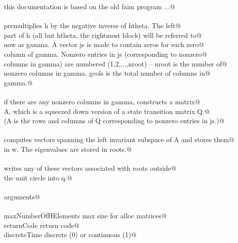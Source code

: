 \documentclass[12pt]{article}
\begin{document}
\begin{flushleft}
\begin{minipage}{\linewidth}
\begin{list}{}{}
\mbox{}\verb@        this documentation is based on the old faim program ...@\\
\mbox{}\verb@@\\
\mbox{}\verb@    premultiplies h by the negative inverse of htheta.  The left@\\
\mbox{}\verb@    part of h (all but htheta, the rightmost block) will be referred to@\\
\mbox{}\verb@    now as gamma.  A vector js is made to contain zeros for each zero@\\
\mbox{}\verb@    column of gamma.  Nonzero entries in js (corresponding to nonzero@\\
\mbox{}\verb@    columns in gamma) are numbered (1,2,...,nroot) -- nroot is the number of@\\
\mbox{}\verb@    nonzero columns in gamma.  gcols is the total number of columns in@\\
\mbox{}\verb@    gamma.@\\
\mbox{}\verb@@\\
\mbox{}\verb@    if there are any nonzero columns in gamma, constructs a matrix@\\
\mbox{}\verb@    A, which is a squeezed down version of a state transition matrix Q.@\\
\mbox{}\verb@    (A is the rows and columns of Q corresponding to nonzero entries in js.)@\\
\mbox{}\verb@@\\
\mbox{}\verb@    computes vectors spanning the left invariant subspace of A and stores them@\\
\mbox{}\verb@    in w.  The eigenvalues are stored in roots.@\\
\mbox{}\verb@@\\
\mbox{}\verb@    writes any of these vectors associated with roots outside@\\
\mbox{}\verb@    the unit circle into q.@\\
\mbox{}\verb@@\\
\mbox{}\verb@        arguments@\\
\mbox{}\verb@@\\
\mbox{}\verb@                maxNumberOfHElements                                            max size for alloc matrices@\\
\mbox{}\verb@                returnCode                                                                      return code@\\
\mbox{}\verb@                discreteTime                                                            discrete (0) or continuous (1)@\\

\end{list}
\end{minipage}
\end{flushleft}
\end{document}
